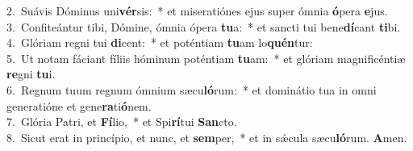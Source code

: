 {2.~}Suávis Dóminus uni\textbf{vér}sis:~* et miseratiónes ejus super ómnia \textbf{ó}pera \textbf{e}jus.\\
{3.~}Confiteántur tibi, Dómine, ómnia ópera \textbf{tu}a:~* et sancti tui bene\textbf{dí}cant \textbf{ti}bi.\\
{4.~}Glóriam regni tui \textbf{di}cent:~* et poténtiam \textbf{tu}am lo\textbf{quén}tur:\\
{5.~}Ut notam fáciant fíliis hóminum poténtiam \textbf{tu}am:~* et glóriam magnificéntiæ \textbf{re}gni \textbf{tu}i.\\
{6.~}Regnum tuum regnum ómnium sæcu\textbf{ló}rum:~* et dominátio tua in omni generatióne et gene\textbf{ra}ti\textbf{ó}nem.\\
{7.~}Glória Patri, et \textbf{Fí}lio,~* et Spi\textbf{rí}tui \textbf{San}cto.\\
{8.~}Sicut erat in princípio, et nunc, et \textbf{sem}per,~* et in sǽcula sæcu\textbf{ló}rum. \textbf{A}men.\\

